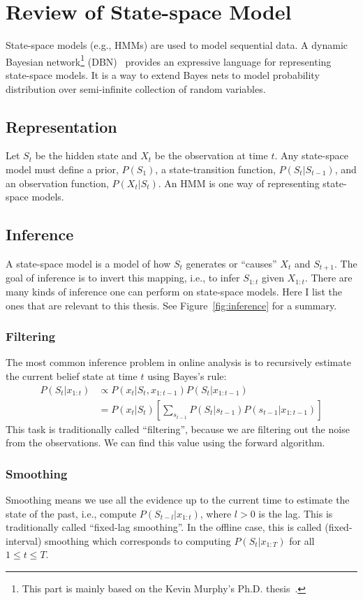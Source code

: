 \chapter{Review of State-space Model}\label{app:dbn} State-space models (e.g.,
HMMs) are used to model sequential data. A dynamic Bayesian network\footnote{This part is mainly based on the Kevin Murphy's Ph.D. thesis~\cite{murphy02}.} (DBN)~\cite{dean89} 
provides an expressive language for representing
state-space models. It is a way to extend
Bayes nets to model probability distribution over semi-infinite collection  of
random variables. 

\section{Representation}
Let $S_t$ be the hidden state and $X_t$ be the observation at time $t$.
Any state-space model must define a prior, $P(S_1)$, a state-transition function, $P(S_t|S_{t-1})$, and an observation function, $P(X_t|S_t)$. An HMM
is one way of representing state-space models.

\section{Inference}\label{sec:inference}
A state-space model is a model of how $S_t$ generates or ``causes'' $X_t$ and
$S_{t+1}$. The goal of inference is to invert this mapping, i.e., to infer
$S_{1:t}$ given $X_{1:t}$. There are many kinds of inference one can perform on
state-space models. Here I list the ones that are relevant to this thesis. See
Figure~\ref{fig:inference} for a summary.

\subsection{Filtering}
The most common inference problem in online analysis is to recursively estimate
the current belief state at time $t$ using Bayes's rule:
\begin{align*}
P(S_t | x_{1:t}) & \propto P(x_t | S_t, x_{1:t-1})P(S_t | x_{1:t-1}) \\
         & = P(x_t | S_t) \left[\sum_{s_{t - 1}}
           P(S_t | s_{t - 1})P(s_{t - 1} | x_{1:t - 1})\right]
\end{align*}
This task is traditionally called ``filtering'', because we are filtering out
the noise from the observations. We can find this value using the forward
algorithm.

\subsection{Smoothing}
Smoothing means we use all the evidence up to the current time to estimate the
state of the past, i.e., compute $P(S_{t-l}|x_{1:t})$, where $l>0$ is the lag.
This is traditionally called ``fixed-lag smoothing''. In the offline case, this
is called (fixed-interval) smoothing which corresponds to computing
$P(S_t|x_{1:T})$ for all $1\leq t\leq T$.

